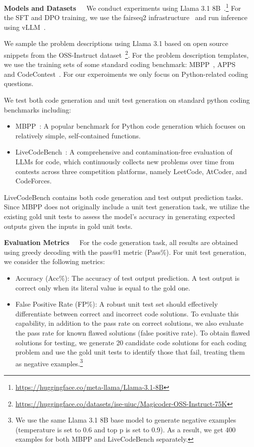 \textbf{Models and Datasets}\ \ \ We conduct experiments using Llama 3.1 8B~\cite{dubey2024llama}.\footnote{\url{https://huggingface.co/meta-llama/Llama-3.1-8B}} For the SFT and DPO training, we use the fairseq2 infrastructure~\cite{balioglu2023fairseq2} and run inference using vLLM~\cite{kwon2023efficient}.

We sample the problem descriptions using Llama 3.1 based on open source snippets from the OSS-Instruct dataset~\cite{wei2024magicoder}\footnote{\url{https://huggingface.co/datasets/ise-uiuc/Magicoder-OSS-Instruct-75K}}. For the problem description templates, we use the training sets of some  standard coding benchmark: MBPP~\cite{austin2021program}, APPS~\cite{hendrycksapps2021} and CodeContest~\cite{li2022competition}. For our experoiments we only focus on Python-related coding questions.

We test both code generation and unit test generation on standard python coding benchmarks including:
\begin{itemize}[nosep,leftmargin=*]
    \item MBPP~\cite{austin2021program}: A popular benchmark for Python code generation which focuses on relatively simple, self-contained functions.
    \item LiveCodeBench~\cite{jain2024livecodebench}: A comprehensive and contamination-free evaluation of LLMs for code, which continuously collects new problems over time from contests across three competition platforms, namely LeetCode, AtCoder, and CodeForces.
\end{itemize}

LiveCodeBench contains both code generation and test output prediction tasks. Since MBPP does not originally include a unit test generation task, we utilize the existing gold unit tests to assess the model’s accuracy in generating expected outputs given the inputs in gold unit tests.

\textbf{Evaluation Metrics}\ \ \ For the code generation task, all results are obtained using greedy decoding with the pass@1 metric (Pass\%). For unit test generation, we consider the following metrics:
\begin{itemize}[nosep,leftmargin=*]
    \item Accuracy (Acc\%): The accuracy of test output prediction. A test output is correct only when its literal value is equal to the gold one.
    \item False Positive Rate (FP\%): A robust unit test set should effectively differentiate between correct and incorrect code solutions. To evaluate this capability, in addition to the pass rate on correct solutions, we also evaluate the pass rate for known flawed solutions (false positive rate). To obtain flawed solutions for testing, we generate 20 candidate code solutions for each coding problem and use the gold unit tests to identify those that fail, treating them as negative examples.\footnote{We use the same Llama 3.1 8B base model to generate negative examples (temperature is set to 0.6 and top p is set to 0.9). As a result, we get 400 examples for both MBPP and LiveCodeBench separately.} 
\end{itemize}

